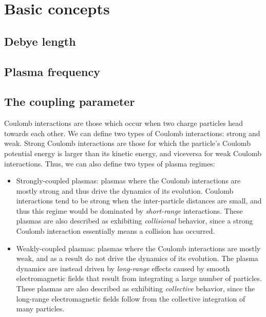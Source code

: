 \documentclass[a4paper,11pt]{report}
\begin{document}
\chapter{Basic concepts}

\section{Debye length}

\section{Plasma frequency}

\section{The coupling parameter}

Coulomb interactions are those which occur when two charge particles head towards each other. We can define two types of Coulomb interactions: strong and weak. Strong Coulomb interactions are those for which the particle's Coulomb potential energy is larger than its kinetic energy, and viceversa for weak Coulomb interactions. Thus, we can also define two types of plasma regimes:
\begin{itemize}
    \item Strongly-coupled plasmas: plasmas where the Coulomb interactions are mostly strong and thus drive the dynamics of its evolution. Coulomb interactions tend to be strong when the inter-particle distances are small, and thus this regime would be dominated by \textit{short-range} interactions. These plasmas are also described as exhibiting \textit{collisional} behavior, since a strong Coulomb interaction essentially means a collision has occurred.
    \item Weakly-coupled plasmas: plasmas where the Coulomb interactions are mostly weak, and as a result do not drive the dynamics of its evolution. The plasma dynamics are instead driven by \textit{long-range} effects caused by smooth electromagnetic fields that result from integrating a large number of particles. These plasmas are also described as exhibiting \textit{collective} behavior, since the long-range electromagnetic fields follow from the collective integration of many particles.
\end{itemize}
\end{document}
